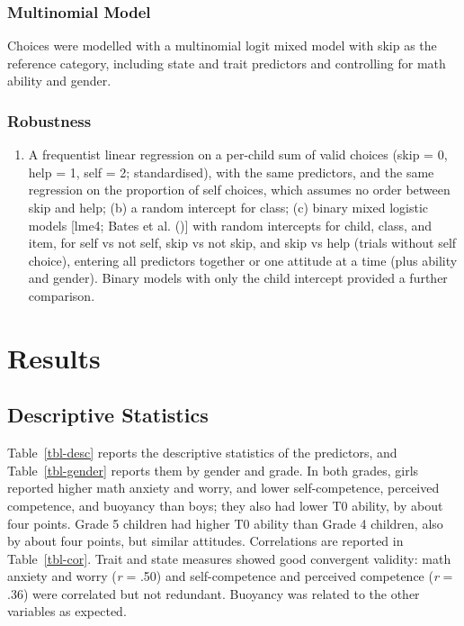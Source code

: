 \documentclass[
  man,
  floatsintext,
  longtable,
  nolmodern,
  notxfonts,
  notimes,
  colorlinks=true,linkcolor=blue,citecolor=blue,urlcolor=blue]{apa7}
\providecommand{\tightlist}{%
  \setlength{\itemsep}{0pt}\setlength{\parskip}{0pt}}
\begin{document}
\subsubsection{Multinomial Model}\label{multinomial-model}

Choices were modelled with a multinomial logit mixed model with skip as
the reference category, including state and trait predictors and
controlling for math ability and gender.

\subsubsection{Robustness}\label{robustness}

\begin{enumerate}
\def\labelenumi{(\alph{enumi})}
\tightlist
\item
  A frequentist linear regression on a per-child sum of valid choices
  (skip = 0, help = 1, self = 2; standardised), with the same
  predictors, and the same regression on the proportion of self choices,
  which assumes no order between skip and help; (b) a random intercept
  for class; (c) binary mixed logistic models {[}lme4; Bates et al.
  (){]} with random intercepts for child,
  class, and item, for self vs not self, skip vs not skip, and skip vs
  help (trials without self choice), entering all predictors together or
  one attitude at a time (plus ability and gender). Binary models with
  only the child intercept provided a further comparison.
\end{enumerate}

\section{Results}\label{results}

\subsection{Descriptive Statistics}\label{descriptive-statistics}

Table~\ref{tbl-desc} reports the descriptive statistics of the
predictors, and Table~\ref{tbl-gender} reports them by gender and grade.
In both grades, girls reported higher math anxiety and worry, and lower
self-competence, perceived competence, and buoyancy than boys; they also
had lower T0 ability, by about four points. Grade 5 children had higher
T0 ability than Grade 4 children, also by about four points, but similar
attitudes. Correlations are reported in Table~\ref{tbl-cor}. Trait and
state measures showed good convergent validity: math anxiety and worry
(\emph{r} = .50) and self-competence and perceived competence (\emph{r}
= .36) were correlated but not redundant. Buoyancy was related to the
other variables as expected.
\end{document}

